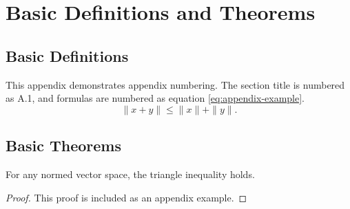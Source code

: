 \chapter{Basic Definitions and Theorems}

\section{Basic Definitions}

This appendix demonstrates appendix numbering. The section title is numbered as A.1, and formulas are numbered as equation \eqref{eq:appendix-example}.
\begin{equation}\label{eq:appendix-example}
  \|x+y\| \le \|x\|+\|y\|.
\end{equation}

\section{Basic Theorems}

\begin{theorem}\label{thm:appendix}
For any normed vector space, the triangle inequality holds.
\end{theorem}

\begin{proof}
This proof is included as an appendix example.
\end{proof}
